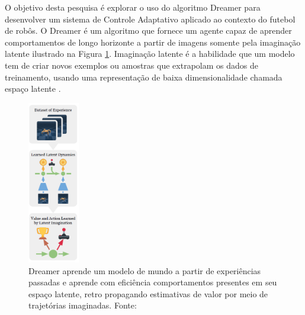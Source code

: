 O objetivo desta pesquisa é explorar o uso do algoritmo Dreamer \cite{dream_v1} para desenvolver um sistema de Controle Adaptativo aplicado ao contexto do futebol de robôs. O Dreamer é um algoritmo que fornece um agente capaz de aprender comportamentos de longo horizonte a partir de imagens somente pela imaginação latente \cite{dream_v1} ilustrado na Figura \ref{fig:resumo_dreamer}. Imaginação latente é a habilidade que um modelo tem de criar novos exemplos ou amostras que extrapolam os dados de treinamento, usando uma representação de baixa dimensionalidade chamada espaço latente \cite{dream_v1}.

\begin{figure}[H]
 \centering
 \includegraphics[width=0.20\textwidth]{./fig/resumo_dreamer.png}

 \caption{Dreamer aprende um modelo de mundo a partir de experiências passadas e aprende com eficiência comportamentos presentes em seu espaço latente, retro propagando estimativas de valor por meio de trajetórias imaginadas.
 Fonte: \cite{dream_v1}}
 \label{fig:resumo_dreamer}
\end{figure}